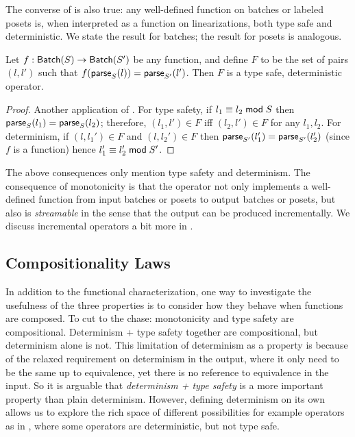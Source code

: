 The converse of  is also true: any well-defined function on batches or labeled posets is, when interpreted as a function on linearizations, both type safe and deterministic. We state the result for batches; the result for posets is analogous.
\begin{theorem}
\label{thm:type-safe-and-deterministic-converse}
Let $f: \batch{S} \to \batch{S'}$ be any function, and define $F$
to be the set of pairs $(l, l')$ such that $f(\parselin{l}{S}) = \parselin{l'}{S'}$.
Then $F$ is a type safe, deterministic operator.
\end{theorem}
\begin{proof}
Another application of .
For type safety, if $\equivtype{l_1}{l_2}{S}$ then $\parselin{l_1}{S} = \parselin{l_2}{S}$; therefore, $(l_1, l') \in F$ iff $(l_2, l') \in F$ for any $l_1, l_2$.
For determinism, if $(l, l_1') \in F$ and $(l, l_2') \in F$ then $\parselin{l_1'}{S'} = \parselin{l_2'}{S'}$ (since $f$ is a function) hence $\equivtype{l_1'}{l_2'}{S'}$.
\end{proof}

The above consequences only mention type safety and determinism.
The consequence of monotonicity is that the operator not only implements a well-defined function from input batches or posets to output batches or posets, but also is \emph{streamable} in the sense that the output can be produced incrementally.
We discuss incremental operators a bit more in .

\subsection{Compositionality Laws}
\label{sec:compositionality-laws}

In addition to the functional characterization, one way to investigate
the usefulness of the three properties is to consider how they behave when functions are composed.
To cut to the chase: monotonicity and type safety are compositional.
Determinism + type safety together are compositional, but determinism alone is not.
This limitation of determinism as a property is because of the relaxed requirement on determinism in the output, where it only need to be the same up to equivalence, yet there is no reference to equivalence in the input.
So it is arguable that \emph{determinism + type safety} is a more important property than plain determinism. However, defining determinism on its own allows us to explore the rich space of different possibilities for example operators as in , where some operators are deterministic, but not type safe.

